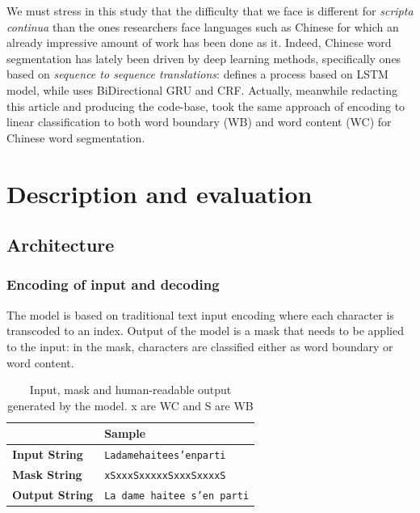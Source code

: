\documentclass{jdmdh}
\begin{document}
We must stress in this study that the difficulty that we face is different for \textit{scripta continua} than the ones researchers face languages such as Chinese for which an already impressive amount of work has been done as it. Indeed, Chinese word segmentation has lately been driven by deep learning methods, specifically ones based on \textit{sequence to sequence translations}: \citet{chen2015long} defines a process based on LSTM model, while \citet{yu2019learning} uses BiDirectional GRU and CRF. Actually, meanwhile redacting this article and producing the code-base, \citet{huang2019realistic} took the same approach of encoding to linear classification to both word boundary (WB) and word content (WC) for Chinese word segmentation.

\section{Description and evaluation}

\subsection{Architecture}

\subsubsection{Encoding of input and decoding}

The model is based on traditional text input encoding where each character is transcoded to an index. Output of the model is a mask that needs to be applied to the input: in the mask, characters are classified either as word boundary or word content. 

\begin{table}[]
\centering
\begin{tabular}{@{}ll@{}}
\hline
                       & \textbf{Sample}           \\  \hline
\textbf{Input  String} & \texttt{Ladamehaitees'enparti}     \\
\textbf{Mask   String} & \texttt{xSxxxSxxxxxSxxxSxxxxS}     \\
\textbf{Output String} & \texttt{La dame haitee s'en parti} \\ \hline
\end{tabular}
  \caption{Input, mask and human-readable output generated by the model. x are WC and S are WB}
  \label{lst:input_output_example}
\end{table}
\end{document}
